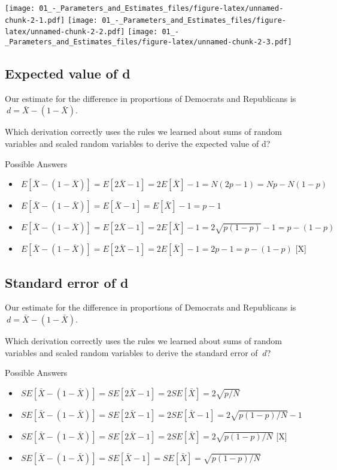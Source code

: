 \documentclass[]{article}
\providecommand{\tightlist}{%
  \setlength{\itemsep}{0pt}\setlength{\parskip}{0pt}}
\begin{document}
\texttt{[image: 01\_-\_Parameters\_and\_Estimates\_files/figure-latex/unnamed-chunk-2-1.pdf]}
\texttt{[image: 01\_-\_Parameters\_and\_Estimates\_files/figure-latex/unnamed-chunk-2-2.pdf]}
\texttt{[image: 01\_-\_Parameters\_and\_Estimates\_files/figure-latex/unnamed-chunk-2-3.pdf]}

\subsection{\texorpdfstring{\textbf{Expected value of
d}}{Expected value of d}}\label{expected-value-of-d}

Our estimate for the difference in proportions of Democrats and
Republicans is \(\ d=\bar{X}−(1−\bar{X})\).

Which derivation correctly uses the rules we learned about sums of
random variables and scaled random variables to derive the expected
value of d?

Possible Answers

\begin{itemize}
\tightlist
\item
  \(\ E[\bar{X}−(1−\bar{X})]=E[2\bar{X}−1] =2E[\bar{X}]−1 = N(2p−1) = Np−N(1−p)\)
\item
  \(\ E[\bar{X}−(1−\bar{X})]=E[\bar{X}−1] =E[\bar{X}]−1 =p−1\)
\item
  \(\ E[\bar{X}−(1−\bar{X})]=E[2\bar{X}−1] =2E[\bar{X}]−1 =2\sqrt{p(1−p)}−1 =p−(1−p)\)
\item
  \(\ E[\bar{X}−(1−\bar{X})]=E[2\bar{X}−1] =2E[\bar{X}]−1 =2p−1 =p−(1−p)\)
  {[}X{]}
\end{itemize}

\subsection{\texorpdfstring{\textbf{Standard error of
d}}{Standard error of d}}\label{standard-error-of-d}

Our estimate for the difference in proportions of Democrats and
Republicans is \(\ d=\bar{X}−(1−\bar{X})\).

Which derivation correctly uses the rules we learned about sums of
random variables and scaled random variables to derive the standard
error of \(\ d\)?

Possible Answers

\begin{itemize}
\tightlist
\item
  \(\ SE[\bar{X}−(1−\bar{X})]=SE[2\bar{X}−1] =2SE[\bar{X}] =2\sqrt{p/N}\)
\item
  \(\ SE[\bar{X}−(1−\bar{X})]=SE[2\bar{X}−1]=2SE[\bar{X}−1]=2\sqrt{p(1−p)/N}−1\)
\item
  \(\ SE[\bar{X}−(1−\bar{X})]=SE[2\bar{X}−1] =2SE[\bar{X}] =2\sqrt{p(1−p)/N}\)
  {[}X{]}
\item
  \(\ SE[\bar{X}−(1−\bar{X})]=SE[\bar{X}−1] =SE[\bar{X}] =\sqrt{p(1−p)/N}\)
\end{itemize}
\end{document}
